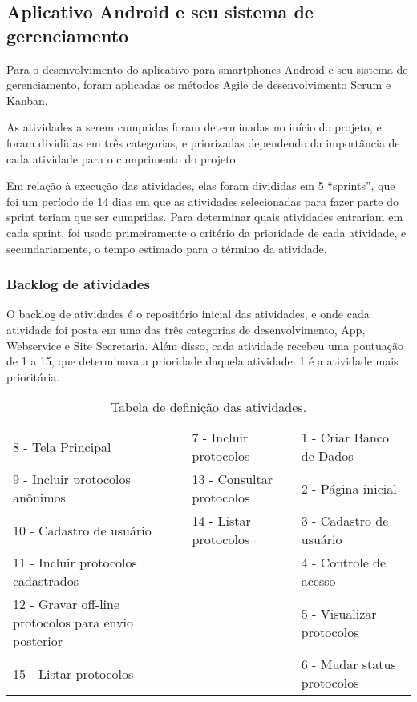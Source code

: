 \documentclass[
	article,			%
	11pt,				%
	oneside,			%
	a4paper,			%
	english,			%
	brazil,				%
	sumario=tradicional
	]{abntex2}
\begin{document}
\subsection{Aplicativo Android e seu sistema de gerenciamento}

Para o desenvolvimento do aplicativo para smartphones Android e seu sistema de
gerenciamento, foram aplicadas os métodos Agile de desenvolvimento Scrum e Kanban.

As atividades a serem cumpridas foram determinadas no início do projeto, e
foram divididas em três categorias, e priorizadas dependendo da importância de
cada atividade para o cumprimento do projeto.

Em relação à execução das atividades, elas foram divididas em 5 “sprints”, que
foi um período de 14 dias em que as atividades selecionadas para fazer parte
do sprint teriam que ser cumpridas. Para determinar quais atividades entrariam
em cada sprint, foi usado primeiramente o critério da prioridade de cada
atividade, e secundariamente, o tempo estimado para o término da atividade.


\subsubsection{Backlog de atividades}

O backlog de atividades é o repositório inicial das atividades, e onde cada
atividade foi posta em uma das três categorias de desenvolvimento, App,
Webservice e Site Secretaria. Além disso, cada atividade recebeu uma pontuação
de 1 a 15, que determinava a prioridade daquela atividade. 1 é a atividade
mais prioritária.

\begin{table}[htbp]
    \caption{Tabela de definição das atividades.}
    \label{tabela-atividades}
    \begin{center}
        \begin{tabular}{|p{5cm}|p{4cm}|p{5cm}|}
            \hline
            8 - Tela Principal & 7 - Incluir protocolos & 1 - Criar Banco de Dados \\
            9 - Incluir protocolos anônimos & 13 - Consultar protocolos & 2 - Página inicial \\
            10 - Cadastro de usuário & 14 - Listar protocolos & 3 - Cadastro de usuário \\
            11 - Incluir protocolos cadastrados & & 4 - Controle de acesso \\
            12 - Gravar off-line protocolos para envio posterior & & 5 - Visualizar protocolos \\
            15 - Listar protocolos & & 6 - Mudar status protocolos \\
            \hline
        \end{tabular}
    \end{center}
\end{table}
\end{document}
